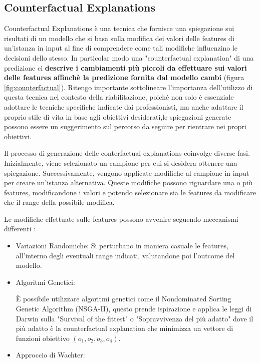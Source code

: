 \begin{flushleft}
\subsection{Counterfactual Explanations}
Counterfactual Explanations è una tecnica che fornisce una  spiegazione sui risultati di un modello che si basa sulla modifica dei valori delle features di un'istanza in input al fine di comprendere come tali modifiche influenzino le decisioni dello stesso.
In particolar modo una "counterfactual explanation" di una predizione ci \textbf{descrive i cambiamenti più piccoli da effettuare sui valori delle features affinchè la predizione fornita dal modello cambi} (figura \ref{fig:counterfactual}).
Ritengo importante sottolineare l'importanza dell'utilizzo di questa tecnica nel contesto della riabilitazione, poiché non solo è essenziale adottare le tecniche specifiche indicate dai professionisti, ma anche adattare il proprio stile di vita in base agli obiettivi desiderati,le spiegazioni generate possono essere un suggerimento sul percorso da seguire per rientrare nei propri obiettivi.


Il processo di generazione delle conterfactual explanations coinvolge diverse fasi. Inizialmente, viene selezionato un campione per cui si desidera ottenere una spiegazione. Successivamente, vengono applicate modifiche al campione in input per creare un'istanza alternativa. Queste modifiche possono riguardare una o più features, modificandone i valori e potendo selezionare sia le features da modificare che il range della possibile modifica.

Le modifiche effettuate sulle features possono avvenire seguendo meccanismi differenti \cite{interpretableml}:
\begin{itemize}
    \item Variazioni Randomiche: Si perturbano in maniera casuale le features, all'interno degli eventuali range indicati, valutandone poi l'outcome del modello.

    \item Algoritmi Genetici: 
    
    È possibile utilizzare algoritmi genetici come il Nondominated Sorting Genetic Algorithm (NSGA-II), questo prende ispirazione e applica le leggi di Darwin sulla "Survival of the fittest" o "Sopravvivenza del più adatto" dove il più adatto è la counterfactual explanation che minimizza un vettore di funzioni obiettivo $(o_1,o_2,o_3,o_4)$.
    \item Approccio di Wachter:


\end{itemize}
\end{flushleft}
